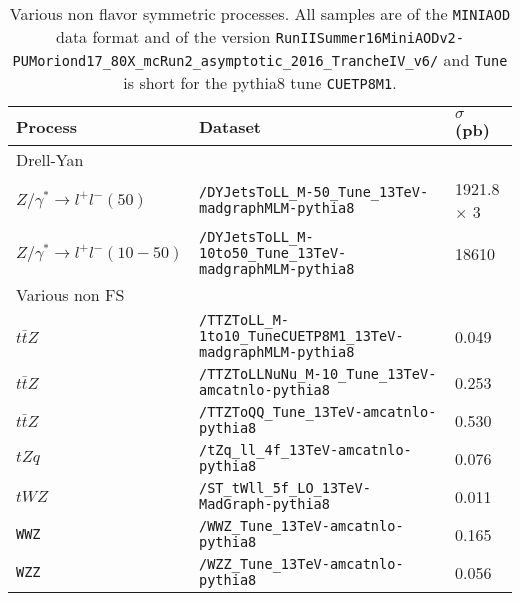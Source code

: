 \begin{table}[ht!]
\begin{center}
\def\arraystretch{1.2}
    \caption{Various non flavor symmetric processes. All samples are of the \texttt{MINIAOD} data format and of the version 
        \texttt{RunIISummer16MiniAODv2-PUMoriond17\_80X\_mcRun2\_asymptotic\_2016\_TrancheIV\_v6/} and \texttt{Tune} is short for the pythia8 tune \texttt{CUETP8M1}.}
    \label{tab:MCsamplesNonFS}
        \begin{tabular}{|l l l|}
        \hline \hline    
        Process     &  Dataset  &  $\sigma$ (pb)          \\\hline
        Drell-Yan     &    &            \\
        \scriptsize{\texttt{$Z/\gamma^{*}\rightarrow l^{+}l^{-} (50)$}}     & \scriptsize{\texttt{/DYJetsToLL\_M-50\_Tune\_13TeV-madgraphMLM-pythia8}}      &  \scriptsize{1921.8 $\times$ 3}       \\
        \scriptsize{\texttt{$Z/\gamma^{*}\rightarrow l^{+}l^{-} (10-50)$}}     & \scriptsize{\texttt{/DYJetsToLL\_M-10to50\_Tune\_13TeV-madgraphMLM-pythia8}}  &  \scriptsize{18610}      \\
        Various non FS     &    &            \\
        \scriptsize{\texttt{$t\bar{t}Z$}}     & \scriptsize{\texttt{/TTZToLL\_M-1to10\_TuneCUETP8M1\_13TeV-madgraphMLM-pythia8}}  &  \scriptsize{0.049}     \\                
        \scriptsize{\texttt{$t\bar{t}Z$}}     & \scriptsize{\texttt{/TTZToLLNuNu\_M-10\_Tune\_13TeV-amcatnlo-pythia8}}  &  \scriptsize{0.253}     \\                
        \scriptsize{\texttt{$t\bar{t}Z$}}     & \scriptsize{\texttt{/TTZToQQ\_Tune\_13TeV-amcatnlo-pythia8}}  &  \scriptsize{0.530}     \\              
        \scriptsize{\texttt{$tZq$}}     & \scriptsize{\texttt{/tZq\_ll\_4f\_13TeV-amcatnlo-pythia8}}  &  \scriptsize{0.076}      \\                           
        \scriptsize{\texttt{$tWZ$}}     & \scriptsize{\texttt{/ST\_tWll\_5f\_LO\_13TeV-MadGraph-pythia8}}  & \scriptsize{0.011}      \\     
        \scriptsize{\texttt{WWZ}}     & \scriptsize{\texttt{/WWZ\_Tune\_13TeV-amcatnlo-pythia8}}  & \scriptsize{ 0.165}      \\      
        \scriptsize{\texttt{WZZ}}     & \scriptsize{\texttt{/WZZ\_Tune\_13TeV-amcatnlo-pythia8}}  & \scriptsize{ 0.056}      \\      

\hline\hline
\end{tabular}
\end{center}
\end{table}                                                                                                                                                                              
